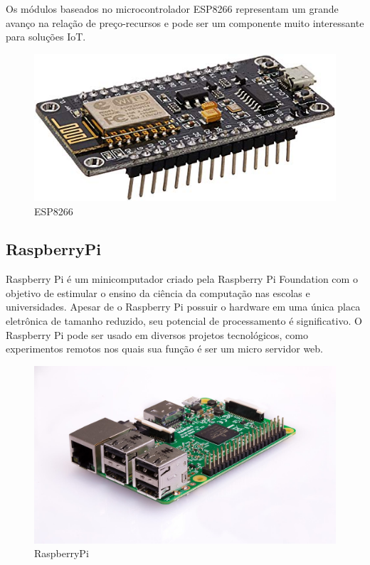 Os módulos baseados no microcontrolador ESP8266 representam um grande avanço na relação de preço-recursos e pode ser um componente muito interessante para soluções IoT.\cite {de2017internet}

\begin{figure}[htbp]
		\centering
		\includegraphics[scale=0.5]{figuras/esp8266_.jpg}
		\caption{ESP8266}
		\label{fig:01}
\end{figure}


\subsection{RaspberryPi}

Raspberry Pi é um minicomputador criado pela Raspberry Pi Foundation com o objetivo de estimular o ensino da ciência da computação nas escolas e universidades. Apesar de o Raspberry Pi possuir o hardware em uma única placa eletrônica de tamanho reduzido, seu potencial de processamento é significativo. O Raspberry Pi pode ser usado em diversos projetos tecnológicos, como experimentos remotos nos quais sua função é ser um micro servidor web.\cite{crotti2013raspberrypi}

\begin{figure}[htbp]
		\centering
		\includegraphics[scale=0.2]{figuras/raspberrypi.jpg}
		\caption{RaspberryPi}
		\label{fig:02}
\end{figure}

